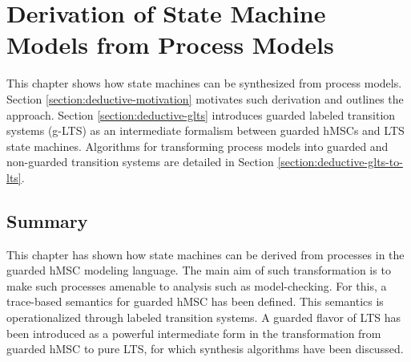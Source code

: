 \chapter{Derivation of State Machine Models from Process Models\label{chapter:deductive}}

This chapter shows how state machines can be synthesized from process models. Section \ref{section:deductive-motivation} motivates such derivation and outlines the approach. Section \ref{section:deductive-glts} introduces guarded labeled transition systems (g-LTS) as an intermediate formalism between guarded hMSCs and LTS state machines. Algorithms for transforming process models into guarded and non-guarded transition systems are detailed in Section \ref{section:deductive-glts-to-lts}.





\section*{Summary}

This chapter has shown how state machines can be derived from processes in the guarded hMSC modeling language. The main aim of such transformation is to make such processes amenable to analysis such as model-checking. For this, a trace-based semantics for guarded hMSC has been defined. This semantics is operationalized through labeled transition systems. A guarded flavor of LTS has been introduced as a powerful intermediate form in the transformation from guarded hMSC to pure LTS, for which synthesis algorithms have been discussed.
